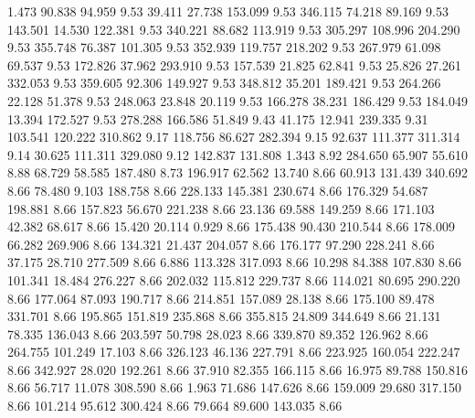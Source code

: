    1.473   90.838   94.959         9.53
  39.411   27.738  153.099         9.53
 346.115   74.218   89.169         9.53
 143.501   14.530  122.381         9.53
 340.221   88.682  113.919         9.53
 305.297  108.996  204.290         9.53
 355.748   76.387  101.305         9.53
 352.939  119.757  218.202         9.53
 267.979   61.098   69.537         9.53
 172.826   37.962  293.910         9.53
 157.539   21.825   62.841         9.53
  25.826   27.261  332.053         9.53
 359.605   92.306  149.927         9.53
 348.812   35.201  189.421         9.53
 264.266   22.128   51.378         9.53
 248.063   23.848   20.119         9.53
 166.278   38.231  186.429         9.53
 184.049   13.394  172.527         9.53
 278.288  166.586   51.849         9.43
  41.175   12.941  239.335         9.31
 103.541  120.222  310.862         9.17
 118.756   86.627  282.394         9.15
  92.637  111.377  311.314         9.14
  30.625  111.311  329.080         9.12
 142.837  131.808    1.343         8.92
 284.650   65.907   55.610         8.88
  68.729   58.585  187.480         8.73
 196.917   62.562   13.740         8.66
  60.913  131.439  340.692         8.66
  78.480    9.103  188.758         8.66
 228.133  145.381  230.674         8.66
 176.329   54.687  198.881         8.66
 157.823   56.670  221.238         8.66
  23.136   69.588  149.259         8.66
 171.103   42.382   68.617         8.66
  15.420   20.114    0.929         8.66
 175.438   90.430  210.544         8.66
 178.009   66.282  269.906         8.66
 134.321   21.437  204.057         8.66
 176.177   97.290  228.241         8.66
  37.175   28.710  277.509         8.66
   6.886  113.328  317.093         8.66
  10.298   84.388  107.830         8.66
 101.341   18.484  276.227         8.66
 202.032  115.812  229.737         8.66
 114.021   80.695  290.220         8.66
 177.064   87.093  190.717         8.66
 214.851  157.089   28.138         8.66
 175.100   89.478  331.701         8.66
 195.865  151.819  235.868         8.66
 355.815   24.809  344.649         8.66
  21.131   78.335  136.043         8.66
 203.597   50.798   28.023         8.66
 339.870   89.352  126.962         8.66
 264.755  101.249   17.103         8.66
 326.123   46.136  227.791         8.66
 223.925  160.054  222.247         8.66
 342.927   28.020  192.261         8.66
  37.910   82.355  166.115         8.66
  16.975   89.788  150.816         8.66
  56.717   11.078  308.590         8.66
   1.963   71.686  147.626         8.66
 159.009   29.680  317.150         8.66
 101.214   95.612  300.424         8.66
  79.664   89.600  143.035         8.66
